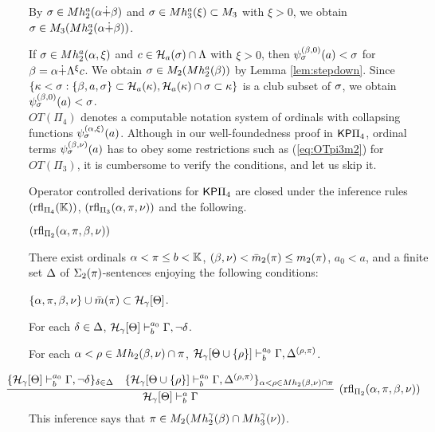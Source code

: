 \documentclass{article}
\newcommand{\mK}{\mathbb{K}}
\begin{document}
By $\sigma\in Mh^{a}_{2}(\alpha\dot{+}\beta)$ and $\sigma\in Mh^{a}_{3}(\xi)\subset M_{3}$ with $\xi>0$, 
we obtain $\sigma\in M_{3}(Mh^{a}_{2}(\alpha\dot{+}\beta))$.
\eprf


\bcor\label{cor:stepdownpi4}
If $\sigma\in Mh^{a}_{2}(\alpha,\xi)$
 and $c\in{\cal H}_{a}(\sigma)\cap\Lambda$ with $\xi>0$, then
$\psi_{\sigma}^{(\beta,0)}(a)<\sigma$ for $\beta=\alpha\dot{+}\Lambda^{\xi}c$.
\ecor
\bprf
We obtain $\sigma\in M_{2}(Mh_{2}^{a}(\beta))$ by Lemma \ref{lem:stepdown}.
Since $\{\kappa<\sigma: \{\beta,a,\sigma\}\subset{\cal H}_{a}(\kappa), {\cal H}_{a}(\kappa)\cap\sigma\subset\kappa\}$
is a club subset of $\sigma$,
we obtain $\psi_{\sigma}^{(\beta,0)}(a)<\sigma$.
\eprf
\\


$OT(\Pi_{4})$ denotes a computable notation system of ordinals with
collapsing functions $\psi_{\sigma}^{(\alpha,\xi)}(a)$.
Although in our well-foundedness proof in ${\sf KP}\Pi_{4}$,
ordinal terms $\psi_{\sigma}^{(\beta,\nu)}(a)$ has to obey some restrictions such as
(\ref{eq:OTpi3m2}) for $OT(\Pi_{3})$,
it is cumbersome to verify the conditions, and let us skip it.

Operator controlled derivations for ${\sf KP}\Pi_{4}$ are closed under the inference rules
$({\rm rfl}_{\Pi_{4}}(\mK))$, $({\rm rfl}_{\Pi_{3}}(\alpha,\pi,\nu))$ and the following.

\bdes
\item[$({\rm rfl}_{\Pi_{2}}(\alpha,\pi,\beta,\nu))$]

There exist ordinals 
$\alp<\pi\leq b<\mK$,
$(\beta,\nu)< \bar{m}_{2}(\pi)\leq m_{2}(\pi)$, 
$a_{0}<a$,
and a finite set $\Delta$ of $\Sigma_{2}(\pi)$-sentences enjoying the following conditions:



\benu

\item
$\{\alpha,\pi,\beta,\nu\}\cup\bar{m}(\pi)\subset{\cal H}_{\gamma}[\Theta]$.



 \item
For each $\delta\in\Delta$,
$
\mathcal{H}_{\gamma}[\Theta]\vdash^{a_{0}}_{b}\Gamma, \lnot\delta
$.

\item
For each $\alpha<\rho\in Mh_{2}(\beta,\nu)\cap \pi$,
$\mathcal{H}_{\gamma}[\Theta\cup \{\rho\}]\vdash^{a_{0}}_{b}\Gamma, 
\Delta^{(\rho,\pi)}$.

\eenu



\[
\hspace{-10mm}
\infer[({\rm rfl}_{\Pi_{2}}(\alp,\pi,\bet,\nu))]{
\calh_{\gam}[\Tht]\vdash^{a}_{b}\Gam}
{
\{
\mathcal{H}_{\gam}[\Tht]\vdash^{a_{0}}_{b}\Gamma, \lnot\del
\}_{\del\in\Del}
&
\{
\mathcal{H}_{\gam}[\Tht\cup \{\rho\}]\vdash^{a_{0}}_{b}\Gamma, 
\Del^{(\rho,\pi)}\}_{\alp<\rho\in Mh_{2}(\bet,\nu)\cap \pi}
}
\]
This inference says that
$\pi\in M_{2}(Mh_{2}^{\gamma}(\beta)\cap Mh_{3}^{\gamma}(\nu))$.
\end{document}
